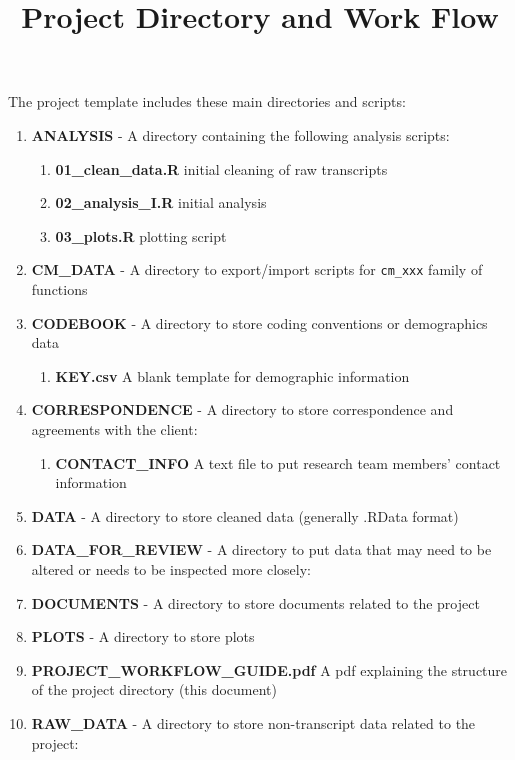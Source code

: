 \documentclass{article}\usepackage[]{graphicx}\usepackage[]{color}
\begin{document}
\title{Project Directory and Work Flow}
\author{}
\date{}
\maketitle

The project template includes these main directories and scripts:

\begin{enumerate}
  \item \textbf{ANALYSIS} - A directory containing the following analysis scripts:
  \begin{enumerate}
    \item \textbf{01\_clean\_data.R} initial cleaning of raw transcripts
    \item \textbf{02\_analysis\_I.R} initial analysis
    \item \textbf{03\_plots.R} plotting script
  \end{enumerate}
  \item \textbf{CM\_DATA} - A directory to export/import scripts for \texttt{cm\_xxx} family of functions
  \item \textbf{CODEBOOK} - A directory to store coding conventions or demographics data
  \begin{enumerate}
    \item \textbf{KEY.csv} A blank template for demographic information
  \end{enumerate}  
  \item \textbf{CORRESPONDENCE} - A directory to store correspondence and agreements 
     with the client:
  \begin{enumerate}
     \item \textbf{CONTACT\_INFO} A text file to put research team members' 
       contact information
  \end{enumerate}  
  \item \textbf{DATA} - A directory to store cleaned data (generally .RData 
     format)
  \item \textbf{DATA\_FOR\_REVIEW} - A directory to put data that may need to be altered or needs to be inspected more closely:
  \item \textbf{DOCUMENTS} - A directory to store documents related to the project
  \item \textbf{PLOTS} - A directory to store plots
  \item \textbf{PROJECT\_WORKFLOW\_GUIDE.pdf} A pdf explaining the structure of the project directory (this document) 
  \item \textbf{RAW\_DATA} - A directory to store non-transcript data related to the project:

\end{enumerate}
\end{document}
